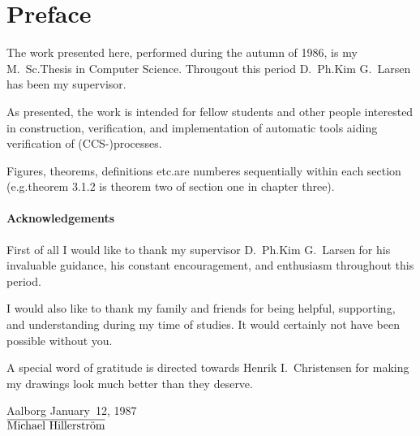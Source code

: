\chapter*{Preface}
\vskip-1cm
%
\noindent
The work presented here, performed during the autumn of 1986, is my
M.~Sc.\@ Thesis in Computer Science. Througout this period D.~Ph.\@ Kim G.~Larsen has been my supervisor.

As presented, the work is intended for fellow students and other people interested
in construction, verification, and implementation of automatic tools aiding verification of (CCS-)processes.

Figures, theorems, definitions etc.\@ are numberes sequentially within each section (e.g.\@ theorem 3.1.2 is theorem two of section one in chapter three).

\subsubsection*{Acknowledgements}
First of all I would like to thank my supervisor D.~Ph.\@ Kim G.~Larsen for his invaluable guidance, his constant encouragement, and enthusiasm throughout this period.

I would also like to thank my family and friends for being helpful, supporting, and understanding during my time of studies. It would certainly not have been possible without you.

A special word of gratitude is directed towards Henrik I.~Christensen for making my drawings look much better than they deserve.

\begin{center}
Aalborg January~12, 1987\\[1.3cm]

$\overline{\hbox{Michael Hillerstr\"om}}$
\end{center}

